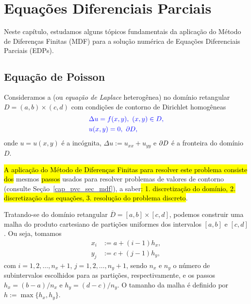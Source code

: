 

\chapter{Equações Diferenciais Parciais}\label{cap_edp}
\thispagestyle{fancy}

Neste capítulo, estudamos alguns tópicos fundamentais da aplicação do Método de Diferenças Finitas (MDF) para a solução numérica de Equações Diferenciais Parciais (EDPs).

\section{Equação de Poisson}\label{cap_edp_sec_poisson}

Consideramos a  (ou \emph{equação de Laplace}{\laplace} heterogênea) no domínio retangular $D = (a, b)\times (c, d)$ com condições de contorno de Dirichlet homogêneas
\begin{subequations}\label{cap_edp_sec_poisson:eq:prob}\hleq
  \begin{align}
    &\Delta u = f(x, y), ~(x, y)\in D, \label{cap_edp_sec_poisson:eq:prob_eq}\\
    &u(x,y) = 0, ~\p D,\label{cap_edp_sec_poisson:eq:prob_bc}
  \end{align}
\end{subequations}
onde $u = u(x,y)$ é a incógnita, $\Delta u := u_{xx} + u_{yy}$ e $\partial D$ é a fronteira do domínio $D$.

\hl{A aplicação do Método de Diferenças Finitas para resolver este problema consiste dos} mesmos \hl{passos} usados para resolver problemas de valores de contorno (consulte Seção~\ref{cap_pvc_sec_mdf}), a saber\hl{: 1. discretização do domínio, 2. discretização das equações, 3. resolução do problema discreto}.

\begin{flushleft}
\end{flushleft}

Tratando-se do domínio retangular $\overline{D} = [a, b]\times [c, d]$, podemos construir uma malha do produto cartesiano de partições uniformes dos intervalos $[a, b]$ e $[c, d]$. Ou seja, tomamos
\begin{subequations}
  \begin{align}
    x_{i} &:= a + (i-1)h_x,\\
    y_{j} &:= c + (j-1)h_y,  
\end{align}
\end{subequations}
com $i = 1, 2, \dotsc, n_x+1$, $j = 1, 2, \dotsc, n_y+1$, sendo $n_x$ e $n_y$ o número de subintervalos escolhidos para as partições, respectivamente, e os passos $h_x = (b-a)/n_x$ e $h_y=(d-c)/n_y$. O tamanho da malha é definido por $h := \max\{h_x, h_y\}$.

